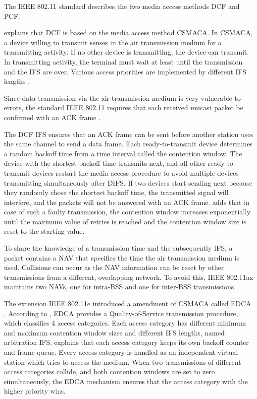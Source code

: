 The IEEE 802.11 standard describes the two media access methods \ac{DCF} and \ac{PCF}.

\textcite{sauter_wireless_2022} explains that \ac{DCF} is based on the media access method \ac{CSMACA}.
In \ac{CSMACA}, a device willing to transmit senses in the air transmission medium for a transmitting activity.
If no other device is transmitting, the device can transmit.
In transmitting activity, the terminal must wait at least until the transmission and the \ac{IFS} are over.
Various access priorities are implemented by different \ac{IFS} lengths \cite{sommer_vehicular_2014}.

Since data transmission via the air transmission medium is very vulnerable to errors,
the standard IEEE 802.11 requires that each received unicast packet be confirmed with an \ac{ACK} frame \cite{sommer_vehicular_2014}.

The \ac{DCF} \ac{IFS} ensures that an \ac{ACK} frame can be sent before another station uses the same channel to send a data frame.
Each ready-to-transmit device determines
a random backoff time from a time interval called the contention window.
The device with the shortest backoff time transmits next, and all other ready-to-transmit devices restart the media access procedure to avoid multiple devices transmitting simultaneously after \ac{DIFS}.
If two devices start sending next because they randomly chose the shortest backoff time,
the transmitted signal will interfere, and the packets will not be answered with an \ac{ACK} frame.
\textcite{sommer_vehicular_2014} adds that in case of such a faulty transmission, the contention window increases exponentially until the maximum value of retries is reached and
the contention window size is reset to the starting value.

To share the knowledge of a transmission time and the subsequently \ac{IFS}, a packet contains a \ac{NAV} that
specifies the time the air transmission medium is used.
Collisions can occur as the \ac{NAV} information can be reset by other transmissions from a different, overlapping network.
To avoid this, IEEE 802.11ax maintains two \ac{NAV}s, one for intra-\ac{BSS} and one for inter-\ac{BSS} transmissions \cite{noauthor_ieee_2021}

The extension IEEE 802.11e introduced a amendment of \ac{CSMACA} called \ac{EDCA} \cite{sommer_vehicular_2014} \cite{wu_ieee_2006}.
According to \textcite{sommer_vehicular_2014}, \ac{EDCA} provides a Quality-of-Service transmission procedure, which classifies \num{4} access categories.
Each access category has different minimum and maximum contention window sizes and different \ac{IFS} lengths, named
arbitration \ac{IFS}.
\textcite{wu_ieee_2006} explains that each access category keeps its own backoff counter and frame queue.
Every access category is handled as an independent virtual station which tries to access the medium.
When two transmissions of different access categories collide, and both contention windows are set to zero simultaneously, the \ac{EDCA} mechanism ensures that the access category with the higher priority wins.

